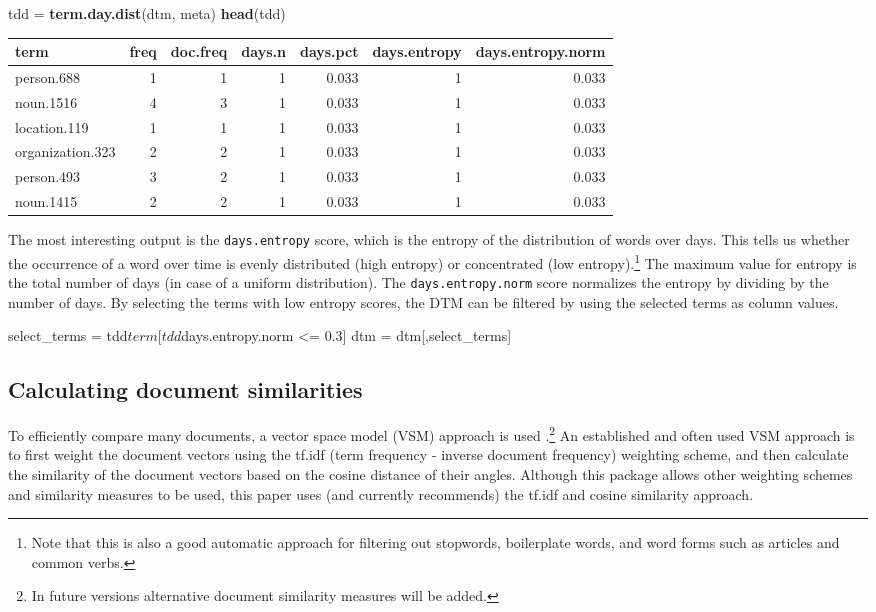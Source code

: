 \documentclass[]{article}
\newenvironment{Shaded}{\begin{snugshade}}{\end{snugshade}}
\newcommand{\KeywordTok}[1]{\textcolor[rgb]{0.13,0.29,0.53}{\textbf{{#1}}}}
\newcommand{\FloatTok}[1]{\textcolor[rgb]{0.00,0.00,0.81}{{#1}}}
\newcommand{\StringTok}[1]{\textcolor[rgb]{0.31,0.60,0.02}{{#1}}}
\newcommand{\NormalTok}[1]{{#1}}
\let\rmarkdownfootnote\footnote%
\def\footnote{\protect\rmarkdownfootnote}
\begin{document}
\begin{Shaded}
\begin{Highlighting}[]
\NormalTok{tdd =}\StringTok{ }\KeywordTok{term.day.dist}\NormalTok{(dtm, meta)}
\KeywordTok{head}\NormalTok{(tdd)}
\end{Highlighting}
\end{Shaded}

\begin{longtable}[c]{@{}lrrrrrr@{}}
\toprule
term & freq & doc.freq & days.n & days.pct & days.entropy &
days.entropy.norm\tabularnewline
\midrule
\endhead
person.688 & 1 & 1 & 1 & 0.033 & 1 & 0.033\tabularnewline
noun.1516 & 4 & 3 & 1 & 0.033 & 1 & 0.033\tabularnewline
location.119 & 1 & 1 & 1 & 0.033 & 1 & 0.033\tabularnewline
organization.323 & 2 & 2 & 1 & 0.033 & 1 & 0.033\tabularnewline
person.493 & 3 & 2 & 1 & 0.033 & 1 & 0.033\tabularnewline
noun.1415 & 2 & 2 & 1 & 0.033 & 1 & 0.033\tabularnewline
\bottomrule
\end{longtable}

The most interesting output is the \texttt{days.entropy} score, which is
the entropy of the distribution of words over days. This tells us
whether the occurrence of a word over time is evenly distributed (high
entropy) or concentrated (low entropy).\footnote{Note that this is also
  a good automatic approach for filtering out stopwords, boilerplate
  words, and word forms such as articles and common verbs.} The maximum
value for entropy is the total number of days (in case of a uniform
distribution). The \texttt{days.entropy.norm} score normalizes the
entropy by dividing by the number of days. By selecting the terms with
low entropy scores, the DTM can be filtered by using the selected terms
as column values.

\begin{Shaded}
\begin{Highlighting}[]
\NormalTok{select_terms =}\StringTok{ }\NormalTok{tdd$term[tdd$days.entropy.norm <=}\StringTok{ }\FloatTok{0.3}\NormalTok{]}
\NormalTok{dtm =}\StringTok{ }\NormalTok{dtm[,select_terms]}
\end{Highlighting}
\end{Shaded}

\subsection{Calculating document
similarities}\label{calculating-document-similarities}

To efficiently compare many documents, a vector space model (VSM)
approach is used \citep{salton75, salton03}.\footnote{In future versions
  alternative document similarity measures will be added.} An
established and often used VSM approach is to first weight the document
vectors using the tf.idf (term frequency - inverse document frequency)
weighting scheme, and then calculate the similarity of the document
vectors based on the cosine distance of their angles. Although this
package allows other weighting schemes and similarity measures to be
used, this paper uses (and currently recommends) the tf.idf and cosine
similarity approach.
\end{document}
